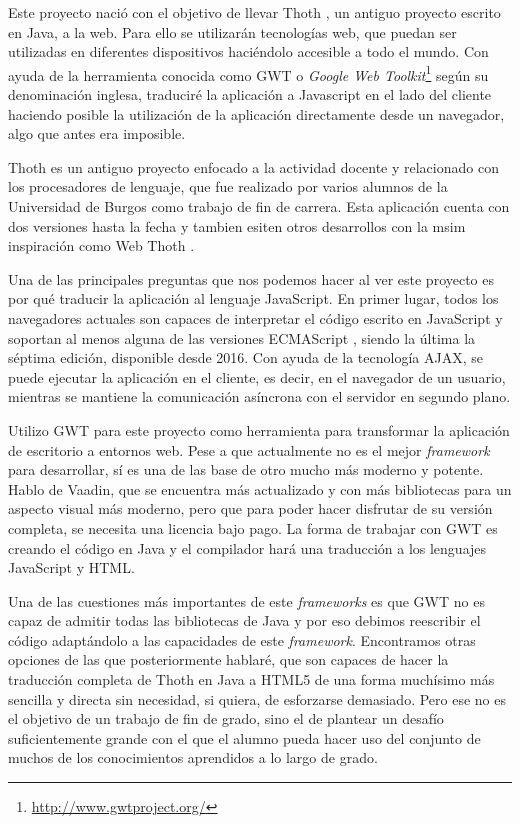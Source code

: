 
Este proyecto nació con el objetivo de llevar Thoth \cite{garcia2007ensenanza}, un antiguo proyecto escrito en Java, a la web. Para ello se utilizarán tecnologías web, que puedan ser utilizadas en diferentes dispositivos haciéndolo accesible a todo el mundo. Con ayuda de la herramienta conocida como GWT o \emph{Google Web Toolkit}\footnote{\url{http://www.gwtproject.org/}} según su denominación inglesa, traduciré la aplicación a Javascript en el lado del cliente haciendo posible la utilización de la aplicación directamente desde un navegador, algo que antes era imposible.

Thoth \cite{garcia2007ensenanza}
 es un antiguo proyecto enfocado a la actividad docente y relacionado con los procesadores de lenguaje, que fue realizado por varios alumnos de la Universidad de Burgos como trabajo de fin de carrera. Esta aplicación cuenta con dos versiones  hasta la fecha y tambien esiten otros desarrollos con la msim inspiración como Web Thoth \cite{jute2017}.

Una de las principales preguntas que nos podemos hacer al ver este proyecto es por qué traducir la aplicación al lenguaje JavaScript. 
En primer lugar, todos los navegadores actuales son capaces de interpretar el código escrito en JavaScript y soportan al menos alguna de las versiones ECMAScript \cite{ecma:versiones}, siendo la última la séptima edición, disponible desde 2016. Con ayuda de la tecnología AJAX, se puede ejecutar la aplicación en el cliente, es decir, en el navegador de un usuario, mientras se mantiene la comunicación asíncrona con el servidor en segundo plano.

Utilizo GWT para este proyecto como herramienta para transformar la aplicación de escritorio a entornos web. Pese a que actualmente no es el mejor \emph{framework} para desarrollar, sí es una de las base de otro mucho más moderno y potente. Hablo de Vaadin, que se encuentra más actualizado y con más bibliotecas para un aspecto visual más moderno, pero que para poder hacer disfrutar de su versión completa, se necesita una licencia bajo pago. La forma de trabajar con GWT es creando el código en Java y el compilador hará una traducción a los lenguajes JavaScript y HTML.

Una de las cuestiones más importantes de este \emph{frameworks} es que GWT no es capaz de admitir todas las bibliotecas de Java y por eso debimos reescribir el código adaptándolo a las capacidades de este \emph{framework}. Encontramos otras opciones de las que posteriormente hablaré, que son capaces de hacer la traducción completa de Thoth en Java a HTML5 de una forma muchísimo más sencilla y directa sin necesidad, si quiera, de esforzarse demasiado. Pero ese no es el objetivo de un trabajo de fin de grado, sino el de plantear un desafío suficientemente grande con el que el alumno pueda hacer uso del conjunto de muchos de los conocimientos aprendidos a lo largo de grado.